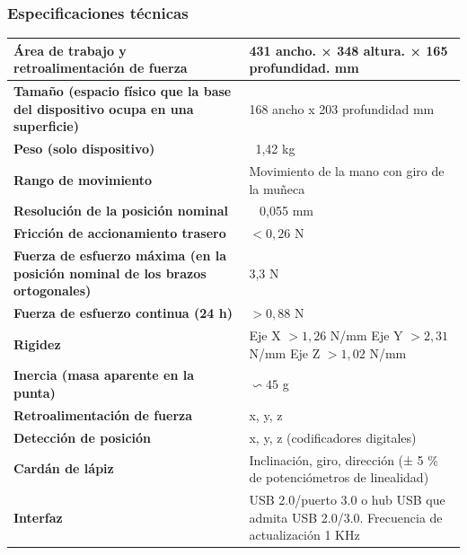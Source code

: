 \documentclass[a4paper,11pt, oneside]{book}
\begin{document}
\subsubsection{Especificaciones técnicas}
\renewcommand{\arraystretch}{1.3}
\begin{center}
	\begin{tabular}{ |m{6cm}|m{6cm}| } 
		\hline
		\textbf{Área de trabajo y retroalimentación de fuerza} & 431 ancho. × 348 altura. × 165 profundidad. mm \\ 
		\hline
		\textbf{Tamaño (espacio físico que la base del dispositivo ocupa en una superficie)} & 168 ancho x 203 profundidad mm  \\ 
		\hline
		\textbf{Peso (solo dispositivo)} & ~1,42 kg  \\ 
		\hline
		\textbf{Rango de movimiento} & Movimiento de la mano con giro de la muñeca \\
		\hline
		\textbf{Resolución de la posición nominal} & ~ 0,055 mm \\
		\hline
		\textbf{Fricción de accionamiento trasero} & $< 0,26$ N \\
		\hline
		\textbf{Fuerza de esfuerzo máxima (en la posición nominal de los brazos ortogonales)} & 3,3 N \\
		\hline
		\textbf{Fuerza de esfuerzo continua (24 h)} & $>0,88$ N \\
		\hline
		\textbf{Rigidez} & \parbox[t]{11em}{Eje X $> 1,26$ N/mm \\ Eje Y $> 2,31$ N/mm  \\ Eje Z $> 1,02$ N/mm} \\
		\hline
		\textbf{Inercia (masa aparente en la punta)} & $\backsim45$ g \\
		\hline
		\textbf{Retroalimentación de fuerza} & x, y, z \\
		\hline
		\textbf{Detección de posición} & x, y, z (codificadores digitales) \\
		\hline
		\textbf{Cardán de lápiz} & Inclinación, giro, dirección (± 5 \% de potenciómetros de linealidad) \\
		\hline
		\textbf{Interfaz} & USB 2.0/puerto 3.0 o hub USB que admita USB 2.0/3.0.
		Frecuencia de actualización 1 KHz \\
		\hline
	\end{tabular}
\end{center}
\end{document}
